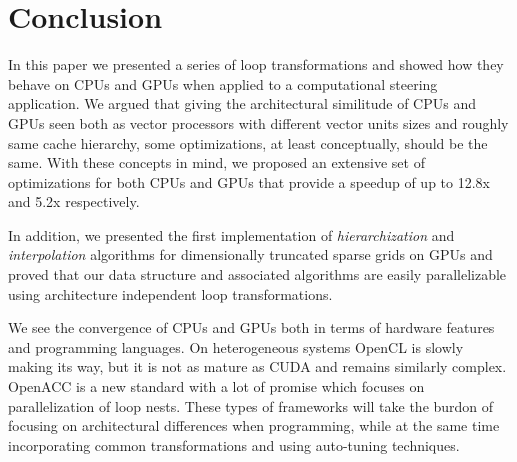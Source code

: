 \section{Conclusion}
\label{sec:conclusion}

In this paper we presented a series of loop transformations and showed
how they behave on CPUs and GPUs when applied to a computational steering
application. We argued that giving the architectural similitude of CPUs and GPUs
seen both as vector processors with different vector units sizes and roughly
same cache hierarchy, some optimizations, at least conceptually, should be the
same. With these concepts in mind, we proposed an extensive set of optimizations
for both CPUs and GPUs that provide a speedup of up to 12.8x and 5.2x
respectively.

In addition, we presented the first implementation of \textit{hierarchization} and
\textit{interpolation} algorithms for dimensionally truncated sparse grids on GPUs
and proved that our data structure and associated algorithms are easily 
parallelizable using architecture independent loop transformations.

We see the convergence of CPUs and GPUs both in terms of hardware features and
programming languages. On heterogeneous systems OpenCL \cite{opencl} is slowly
making its way, but it is not as mature as CUDA and remains similarly complex.
OpenACC \cite{openacc} is a new standard with a lot of promise which focuses on
parallelization of loop nests. These types of frameworks will take the burdon
of focusing on architectural differences when programming, while at the same
time incorporating common transformations and using auto-tuning techniques.
